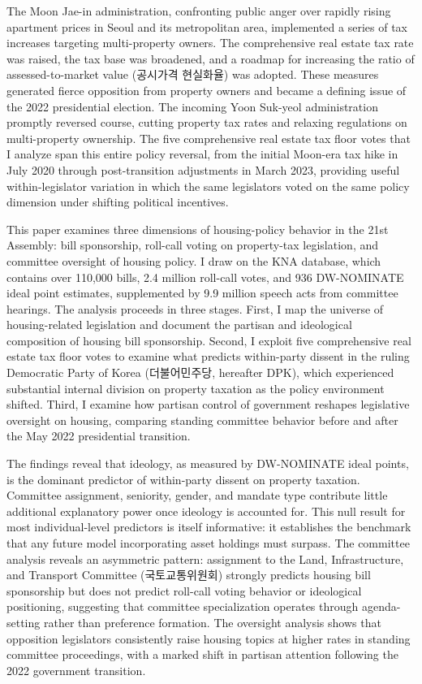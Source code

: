 \documentclass[11pt]{article}
\begin{document}
The Moon Jae-in administration, confronting public anger over rapidly rising apartment prices in Seoul and its metropolitan area, implemented a series of tax increases targeting multi-property owners. The comprehensive real estate tax rate was raised, the tax base was broadened, and a roadmap for increasing the ratio of assessed-to-market value (공시가격 현실화율) was adopted. These measures generated fierce opposition from property owners and became a defining issue of the 2022 presidential election. The incoming Yoon Suk-yeol administration promptly reversed course, cutting property tax rates and relaxing regulations on multi-property ownership. The five comprehensive real estate tax floor votes that I analyze span this entire policy reversal, from the initial Moon-era tax hike in July 2020 through post-transition adjustments in March 2023, providing useful within-legislator variation in which the same legislators voted on the same policy dimension under shifting political incentives.

This paper examines three dimensions of housing-policy behavior in the 21st Assembly: bill sponsorship, roll-call voting on property-tax legislation, and committee oversight of housing policy. I draw on the KNA database, which contains over 110,000 bills, 2.4 million roll-call votes, and 936 DW-NOMINATE ideal point estimates, supplemented by 9.9 million speech acts from committee hearings. The analysis proceeds in three stages. First, I map the universe of housing-related legislation and document the partisan and ideological composition of housing bill sponsorship. Second, I exploit five comprehensive real estate tax floor votes to examine what predicts within-party dissent in the ruling Democratic Party of Korea (더불어민주당, hereafter DPK), which experienced substantial internal division on property taxation as the policy environment shifted. Third, I examine how partisan control of government reshapes legislative oversight on housing, comparing standing committee behavior before and after the May 2022 presidential transition.

The findings reveal that ideology, as measured by DW-NOMINATE ideal points, is the dominant predictor of within-party dissent on property taxation. Committee assignment, seniority, gender, and mandate type contribute little additional explanatory power once ideology is accounted for. This null result for most individual-level predictors is itself informative: it establishes the benchmark that any future model incorporating asset holdings must surpass. The committee analysis reveals an asymmetric pattern: assignment to the Land, Infrastructure, and Transport Committee (국토교통위원회) strongly predicts housing bill sponsorship but does not predict roll-call voting behavior or ideological positioning, suggesting that committee specialization operates through agenda-setting rather than preference formation. The oversight analysis shows that opposition legislators consistently raise housing topics at higher rates in standing committee proceedings, with a marked shift in partisan attention following the 2022 government transition.
\end{document}
